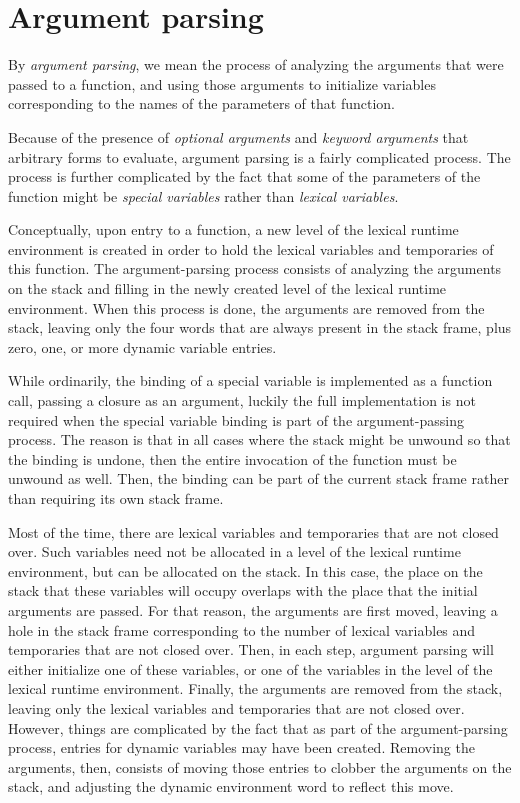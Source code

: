\section{Argument parsing}

By \emph{argument parsing}, we mean the process of analyzing the
arguments that were passed to a function, and using those arguments to
initialize variables corresponding to the names of the parameters of
that function.

Because of the presence of \emph{optional arguments} and \emph{keyword
  arguments} that arbitrary forms to evaluate, argument parsing is a
fairly complicated process.  The process is further complicated by the
fact that some of the parameters of the function might be
\emph{special variables} rather than \emph{lexical variables}.

Conceptually, upon entry to a function, a new level of the lexical
runtime environment is created in order to hold the lexical variables
and temporaries of this function.  The argument-parsing process
consists of analyzing the arguments on the stack and filling in the
newly created level of the lexical runtime environment.  When this
process is done, the arguments are removed from the stack, leaving
only the four words that are always present in the stack frame, plus
zero, one, or more dynamic variable entries.

While ordinarily, the binding of a special variable is implemented as
a function call, passing a closure as an argument, luckily the full
implementation is not required when the special variable binding is
part of the argument-passing process.  The reason is that in all cases
where the stack might be unwound so that the binding is undone, then
the entire invocation of the function must be unwound as well.  Then,
the binding can be part of the current stack frame rather than
requiring its own stack frame.

Most of the time, there are lexical variables and temporaries that are
not closed over.  Such variables need not be allocated in a level of
the lexical runtime environment, but can be allocated on the stack.
In this case, the place on the stack that these variables will occupy
overlaps with the place that the initial arguments are passed.  For
that reason, the arguments are first moved, leaving a hole in the
stack frame corresponding to the number of lexical variables and
temporaries that are not closed over.  Then, in each step, argument
parsing will either initialize one of these variables, or one of the
variables in the level of the lexical runtime environment.  Finally,
the arguments are removed from the stack, leaving only the lexical
variables and temporaries that are not closed over.  However, things
are complicated by the fact that as part of the argument-parsing
process, entries for dynamic variables may have been created.
Removing the arguments, then, consists of moving those entries to
clobber the arguments on the stack, and adjusting the dynamic
environment word to reflect this move.

